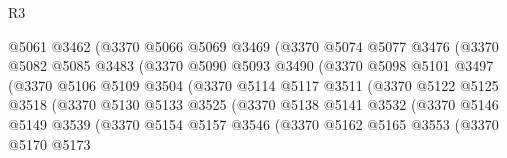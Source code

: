 \begin{lexlean}{R3}
\begin{coremodule}
                          @5061
                          @3462
                          (@3370
                            @5066
                            @5069
                            @3469
                            (@3370
                              @5074
                              @5077
                              @3476
                              (@3370
                                @5082
                                @5085
                                @3483
                                (@3370
                                  @5090
                                  @5093
                                  @3490
                                  (@3370
                                    @5098
                                    @5101
                                    @3497
                                    (@3370
                                      @5106
                                      @5109
                                      @3504
                                      (@3370
                                        @5114
                                        @5117
                                        @3511
                                        (@3370
                                          @5122
                                          @5125
                                          @3518
                                          (@3370
                                            @5130
                                            @5133
                                            @3525
                                            (@3370
                                              @5138
                                              @5141
                                              @3532
                                              (@3370
                                                @5146
                                                @5149
                                                @3539
                                                (@3370
                                                  @5154
                                                  @5157
                                                  @3546
                                                  (@3370
                                                    @5162
                                                    @5165
                                                    @3553
                                                    (@3370
                                                      @5170
                                                      @5173

\end{coremodule}
\end{lexlean}
